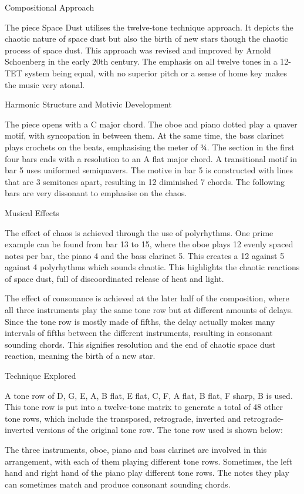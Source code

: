 \documentclass[a4paper]{article}
\title{}
\author{}
\begin{document}
\maketitle

Compositional Approach

The piece Space Dust utilises the twelve-tone technique approach. It depicts the chaotic nature of space dust but also the birth of new stars though the chaotic process of space dust. This approach was revised and improved by Arnold Schoenberg in the early 20th century. The emphasis on all twelve tones in a 12-TET system being equal, with no superior pitch or a sense of home key makes the music very atonal.

Harmonic Structure and Motivic Development


The piece opens with a C major chord. The oboe and piano dotted play a quaver motif, with syncopation in between them. At the same time, the bass clarinet plays crochets on the beats, emphasising the meter of ¾.  The section in the first four bars ends with a resolution to an A flat major chord. A transitional motif in bar 5 uses uniformed semiquavers. The motive in bar 5 is constructed with lines that are 3 semitones apart, resulting in 12 diminished 7 chords. The following bars are very dissonant to emphasise on the chaos.

Musical Effects

The effect of chaos is achieved through the use of polyrhythms. One prime example can be found from bar 13 to 15, where the oboe plays 12 evenly spaced notes per bar, the piano 4 and the bass clarinet 5. This creates a 12 against 5 against 4 polyrhythms which sounds chaotic. This highlights the chaotic reactions of space dust, full of discoordinated release of heat and light.

The effect of consonance is achieved at the later half of the composition, where all three instruments play the same tone row but at different amounts of delays. Since the tone row is mostly made of fifths, the delay actually makes many intervals of fifths between the different instruments, resulting in consonant sounding chords. This signifies resolution and the end of chaotic space dust reaction, meaning the birth of a new star.

Technique Explored

A tone row of D, G, E, A, B flat, E flat, C, F, A flat, B flat, F sharp, B is used. This tone row is put into a twelve-tone matrix to generate a total of 48 other tone rows, which include the transposed, retrograde, inverted and retrograde-inverted versions of the original tone row. The tone row used is shown below:

The three instruments, oboe, piano and bass clarinet are involved in this arrangement, with each of them playing different tone rows. Sometimes, the left hand and right hand of the piano play different tone rows. The notes they play can sometimes match and produce consonant sounding chords.
\end{document}
